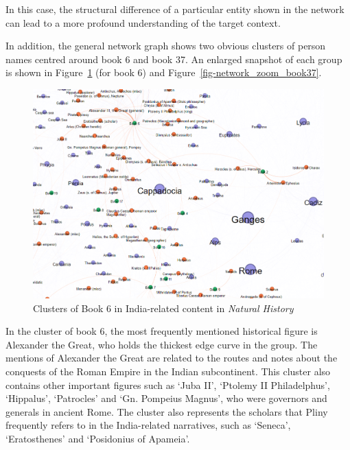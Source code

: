\documentclass[
  12pt,
]{article}
\begin{document}
In this case, the structural difference of a particular entity shown in
the network can lead to a more profound understanding of the target
context.

In addition, the general network graph shows two obvious clusters of
person names centred around book 6 and book 37. An enlarged snapshot of
each group is shown in Figure~\ref{fig-network_zoom_book6} (for book 6)
and Figure~\ref{fig-network_zoom_book37}.

\begin{figure}

{\centering \includegraphics{NHthesis_structure_files/figure-pdf/fig-network_zoom_book6-output-1.png}

}

\caption{\label{fig-network_zoom_book6}Clusters of Book 6 in
India-related content in \emph{Natural History}}

\end{figure}

In the cluster of book 6, the most frequently mentioned historical
figure is Alexander the Great, who holds the thickest edge curve in the
group. The mentions of Alexander the Great are related to the routes and
notes about the conquests of the Roman Empire in the Indian
subcontinent. This cluster also contains other important figures such as
`Juba II', `Ptolemy II Philadelphus', `Hippalus', `Patrocles' and `Gn.
Pompeius Magnus', who were governors and generals in ancient Rome. The
cluster also represents the scholars that Pliny frequently refers to in
the India-related narratives, such as `Seneca', `Eratosthenes' and
`Posidonius of Apameia'.
\end{document}
